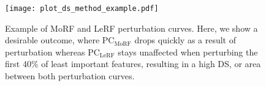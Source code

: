 \begin{figure}[!htbp]
\texttt{[image: plot\_ds\_method\_example.pdf]}
\caption{Example of MoRF and LeRF perturbation curves. Here, we show a desirable outcome, where $\text{PC}_{\text{MoRF}}$ drops quickly as a result of perturbation whereas $\text{PC}_{\text{LeRF}}$ stays unaffected when perturbing the first 40\% of least important features, resulting in a high DS, or area between both perturbation curves.}\label{fig:ds_method_example}
\end{figure}